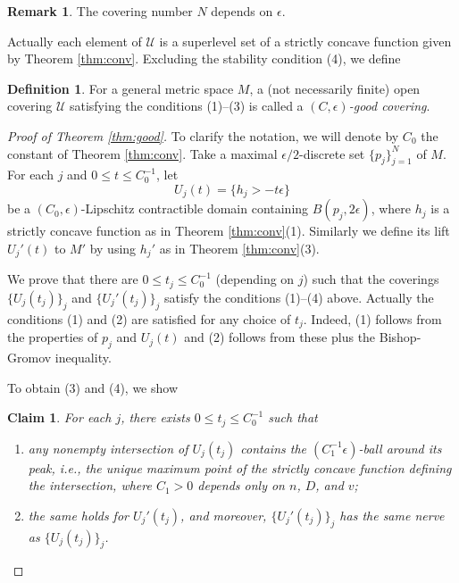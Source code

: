 \documentclass[a4paper,12pt]{amsart}
\theoremstyle{plain}
\newtheorem{clm}[thm]{Claim}
\theoremstyle{definition}
\newtheorem{dfn}[thm]{Definition}
\newtheorem{rem}[thm]{Remark}
\numberwithin{thm}{section}
\numberwithin{equation}{section}
\begin{document}
\begin{rem}
The covering number $N$ depends on $\epsilon$.
\end{rem}

Actually each element of $\mathcal U$ is a superlevel set of a strictly concave function given by Theorem \ref{thm:conv}.
Excluding the stability condition (4), we define

\begin{dfn}\label{dfn:good}
For a general metric space $M$, a (not necessarily finite) open covering $\mathcal U$ satisfying the conditions (1)--(3) is called a \textit{$(C,\epsilon)$-good covering}.
\end{dfn}

\begin{proof}[Proof of Theorem \ref{thm:good}]
To clarify the notation, we will denote by $C_0$ the constant of Theorem \ref{thm:conv}.
Take a maximal $\epsilon/2$-discrete set $\{p_j\}_{j=1}^N$ of $M$.
For each $j$ and $0\le t\le C_0^{-1}$, let
\[U_j(t)=\{h_j>-t\epsilon\}\]
be a $(C_0,\epsilon)$-Lipschitz contractible domain containing $B(p_j,2\epsilon)$, where $h_j$ is a strictly concave function as in Theorem \ref{thm:conv}(1).
Similarly we define its lift $U_j'(t)$ to $M'$ by using $h_j'$ as in Theorem \ref{thm:conv}(3).

We prove that there are $0\le t_j\le C_0^{-1}$ (depending on $j$) such that the coverings $\{U_j(t_j)\}_j$ and $\{U_j'(t_j)\}_j$ satisfy the conditions (1)--(4) above.
Actually the conditions (1) and (2) are satisfied for any choice of $t_j$.
Indeed, (1) follows from the properties of $p_j$ and $U_j(t)$ and (2) follows from these plus the Bishop-Gromov inequality.

To obtain (3) and (4), we show

\begin{clm}\label{clm:good}
For each $j$, there exists $0\le t_j\le C_0^{-1}$ such that
\begin{enumerate}
\item[(i)] any nonempty intersection of $U_j(t_j)$ contains the $(C_1^{-1}\epsilon)$-ball around its \textit{peak}, i.e., the unique maximum point of the strictly concave function defining the intersection, where $C_1>0$ depends only on $n$, $D$, and $v$;
\item[(ii)] the same holds for $U_j'(t_j)$, and moreover, $\{U_j'(t_j)\}_j$ has the same nerve as $\{U_j(t_j)\}_j$.
\end{enumerate}
\end{clm}


\end{proof}
\end{document}
